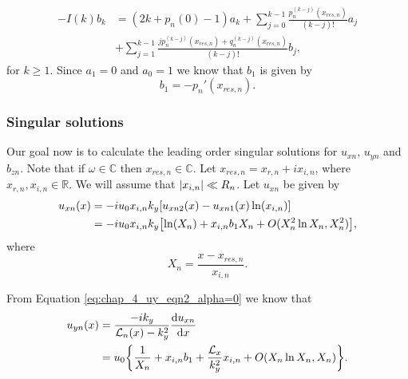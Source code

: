 \begin{equation}
\begin{aligned}
    -I(k)b_k &= (2k + p_n(0) - 1)a_k + \sum_{j=0}^{k-1}\frac{p_n^{(k-j)}(x_{res,n})}{(k-j)!}a_j \\
    &+ \sum_{j=1}^{k-1}\frac{jp_n^{(k-j)}(x_{res,n})+q_n^{(k-j)}(x_{res,n})}{(k-j)!}b_j,
\end{aligned}
\end{equation}
for $k\ge1$. Since $a_1=0$ and $a_0=1$ we know that $b_1$ is given by
\begin{equation}
    b_1 = -p_n'(x_{res,n}).
\end{equation}

\subsubsection{Singular solutions}

Our goal now is to calculate the leading order singular solutions for $u_{xn}$, $u_{y n}$ and $b_{zn}$. Note that if $\omega\in\mathds{C}$ then $x_{res,n}\in\mathds{C}$. Let $x_{res,n}=x_{r,n} + i x_{i,n}$, where $x_{r,n},x_{i,n}\in \mathds{R}$. We will assume that $\abs{x_{i,n}}\ll R_n$. Let $u_{xn}$ be given by
\begin{equation}
\label{eq:uxn_leading_order_solution}
\begin{aligned}
    u_{xn}(x) &= -iu_0 x_{i,n} k_y\qty[u_{xn2}(x) - u_{xn1}(x)\ln(x_{i,n})] \\
    &= -iu_0 x_{i,n} k_y \qty[\ln(X_n)+ x_{i,n}b_1X_n + O(X_n^2\ln X_n,X_n^2)],
\end{aligned}
\end{equation}
where
\begin{equation}
    X_n = \frac{x-x_{res,n}}{x_{i,n}}.
\end{equation}

From Equation \eqref{eq:chap_4_uy_eqn2_alpha=0} we know that
\begin{equation}
\label{eq:uyn_leading_order_solution}
\begin{aligned}
    u_{yn}(x) &= \frac{-ik_y}{\mathcal{L}_n(x)-k_y^2}\dv{u_{xn}}{x} \\
    &=u_0\qty{\frac{1}{X_n} + x_{i,n}b_1 + \frac{\mathcal{L}_x}{k_y^2}x_{i,n} + O\qty(X_n\ln X_n, X_n)}.
\end{aligned}
\end{equation}

